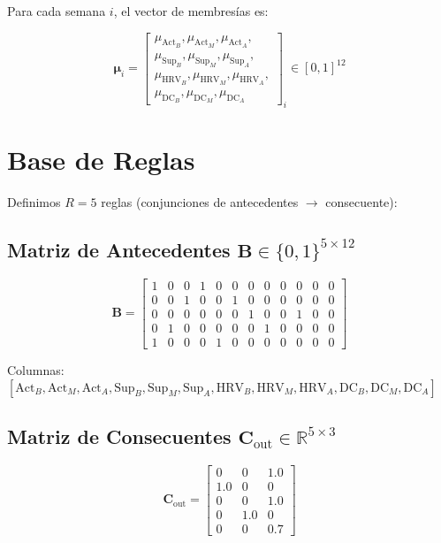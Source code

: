 \documentclass[12pt]{article}
\begin{document}
Para cada semana $i$, el vector de membresías es:

\[
\boldsymbol{\mu}_i = \begin{bmatrix}
\mu_{\text{Act}_B}, \mu_{\text{Act}_M}, \mu_{\text{Act}_A}, \\
\mu_{\text{Sup}_B}, \mu_{\text{Sup}_M}, \mu_{\text{Sup}_A}, \\
\mu_{\text{HRV}_B}, \mu_{\text{HRV}_M}, \mu_{\text{HRV}_A}, \\
\mu_{\text{DC}_B}, \mu_{\text{DC}_M}, \mu_{\text{DC}_A}
\end{bmatrix}_i \in [0,1]^{12}
\]

\section{Base de Reglas}

Definimos $R = 5$ reglas (conjunciones de antecedentes $\to$ consecuente):

\subsection*{Matriz de Antecedentes $\mathbf{B} \in \{0,1\}^{5 \times 12}$}

\[
\mathbf{B} = \begin{bmatrix}
1 & 0 & 0 & 1 & 0 & 0 & 0 & 0 & 0 & 0 & 0 & 0 \\ %
0 & 0 & 1 & 0 & 0 & 1 & 0 & 0 & 0 & 0 & 0 & 0 \\ %
0 & 0 & 0 & 0 & 0 & 0 & 1 & 0 & 0 & 1 & 0 & 0 \\ %
0 & 1 & 0 & 0 & 0 & 0 & 0 & 1 & 0 & 0 & 0 & 0 \\ %
1 & 0 & 0 & 0 & 1 & 0 & 0 & 0 & 0 & 0 & 0 & 0   %
\end{bmatrix}
\]

Columnas: $[\text{Act}_B, \text{Act}_M, \text{Act}_A, \text{Sup}_B, \text{Sup}_M, \text{Sup}_A, \text{HRV}_B, \text{HRV}_M, \text{HRV}_A, \text{DC}_B, \text{DC}_M, \text{DC}_A]$

\subsection*{Matriz de Consecuentes $\mathbf{C}_{\text{out}} \in \mathbb{R}^{5 \times 3}$}

\[
\mathbf{C}_{\text{out}} = \begin{bmatrix}
0 & 0 & 1.0 \\ %
1.0 & 0 & 0 \\ %
0 & 0 & 1.0 \\ %
0 & 1.0 & 0 \\ %
0 & 0 & 0.7   %
\end{bmatrix}
\]
\end{document}
